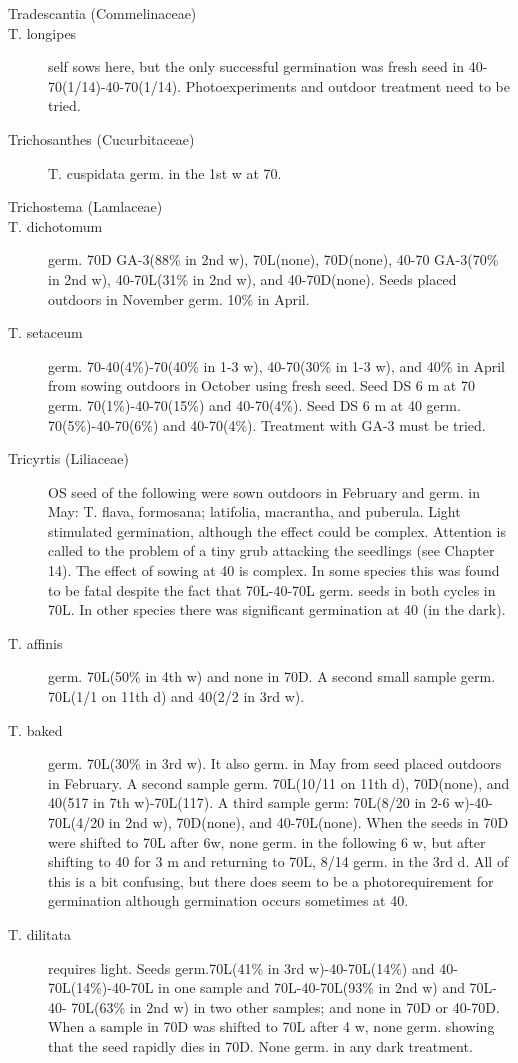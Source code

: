 \begin{description}
\item[Tradescantia (Commelinaceae)]
\item[T. longipes] self sows here, but the only successful germination was fresh seed
in 40-70(1/14)-40-70(1/14). Photoexperiments and outdoor treatment need to be tried.
\item[Trichosanthes (Cucurbitaceae)] T. cuspidata germ. in the 1st w at 70.
\item[Trichostema (Lamlaceae)]
\item[T. dichotomum] germ. 70D GA-3(88\% in 2nd w), 70L(none), 70D(none), 40-70
GA-3(70\% in 2nd w), 40-70L(31\% in 2nd w), and 40-70D(none). Seeds placed
outdoors in November germ. 10\% in April.
\item[T. setaceum] germ. 70-40(4\%)-70(40\% in 1-3 w), 40-70(30\% in 1-3 w), and 40\%
in April from sowing outdoors in October using fresh seed. Seed DS 6 m at 70 germ.
70(1\%)-40-70(15\%) and 40-70(4\%). Seed DS 6 m at 40 germ. 70(5\%)-40-70(6\%)
and 40-70(4\%). Treatment with GA-3 must be tried.

\item[Tricyrtis (Liliaceae)] OS seed of the following were sown outdoors in
February and germ. in May: T. flava, formosana; latifolia, macrantha, and puberula.
Light stimulated germination, although the effect could be complex. Attention is called
to the problem of a tiny grub attacking the seedlings (see Chapter 14). The effect of
sowing at 40 is complex. In some species this was found to be fatal despite the fact
that 70L-40-70L germ. seeds in both cycles in 70L. In other species there was
significant germination at 40 (in the dark).
\item[T. affinis] germ. 70L(50\% in 4th w) and none in 70D. A second small sample
germ. 70L(1/1 on 11th d) and 40(2/2 in 3rd w).
\item[T. baked] germ. 70L(30\% in 3rd w). It also germ. in May from seed placed
outdoors in February. A second sample germ. 70L(10/11 on 11th d), 70D(none), and
40(517 in 7th w)-70L(117). A third sample germ: 70L(8/20 in 2-6 w)-40-70L(4/20 in 2nd
w), 70D(none), and 40-70L(none). When the seeds in 70D were shifted to 70L after
6w, none germ. in the following 6 w, but after shifting to 40 for 3 m and returning to
70L, 8/14 germ. in the 3rd d. All of this is a bit confusing, but there does seem to be a
photorequirement for germination although germination occurs sometimes at 40.

\item[T. dilitata] requires light. Seeds germ.70L(41\% in 3rd w)-40-70L(14\%) and 40-
70L(14\%)-40-70L in one sample and 70L-40-70L(93\% in 2nd w) and 70L-40-
70L(63\% in 2nd w) in two other samples; and none in 70D or 40-70D. When a sample
in 70D was shifted to 70L after 4 w, none germ. showing that the seed rapidly dies in
70D. None germ. in any dark treatment.


\end{description}
